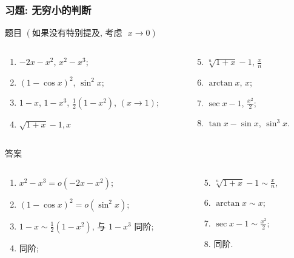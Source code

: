 \documentclass[
10pt,
aspectratio=43,
]{beamer}
\begin{document}
\begin{frame}
	\frametitle{习题: 无穷小的判断 }
	\begin{block}{题目 $(\text{如果没有特别提及, 考虑 }\,\,x\to0)$}
		\begin{columns}[onlytextwidth]
			\begin{column}{0.5\textwidth}
				\begin{enumerate}
					\item $-2x-x^2$, $x^2-x^3$;
					\item $(1-\cos x)^2$, $\sin^2 x$;
					\item $1-x$, $1-x^3$, $\frac{1}{2}(1-x^2)$, $(x\to1)$;
					\item $\sqrt{1+x}-1, x$
				\end{enumerate}
			\end{column}
			\begin{column}{0.5\textwidth}
				\begin{enumerate}
					\setcounter{enumi}{4}
					\item $\displaystyle\sqrt[n]{1+x}-1$, $\displaystyle\frac{x}{n}$
					\item $\arctan x$, $x$;
					\item $\sec x-1$, $\displaystyle\frac{x^2}{2}$;
					\item $\tan x-\sin x$, $\sin^3 x$.
				\end{enumerate}
			\end{column}
		\end{columns}
	\end{block}
	\begin{exampleblock}{答案}
		\begin{columns}[onlytextwidth]
			\begin{column}{0.5\textwidth}
				\begin{enumerate}
					\item $x^2-x^3=o(-2x-x^2)$;
					      \pause
					\item $(1-\cos x)^2=o(\sin^2 x)$;
					      \pause
					\item $1-x \sim \frac{1}{2}(1-x^2)$, 与 $1-x^3$ 同阶;
					      \pause
					\item 同阶;
				\end{enumerate}
			\end{column}
			\begin{column}{0.5\textwidth}
				\begin{enumerate}
					\setcounter{enumi}{4}
					\pause
					\item $\displaystyle\sqrt[n]{1+x}-1\sim\displaystyle\frac{x}{n}$,
					      \pause
					\item $\arctan x\sim x$;
					      \pause
					\item $\sec x-1\sim\displaystyle\frac{x^2}{2}$;
					      \pause
					\item 同阶.
				\end{enumerate}
			\end{column}
		\end{columns}
	\end{exampleblock}
\end{frame}
\end{document}
